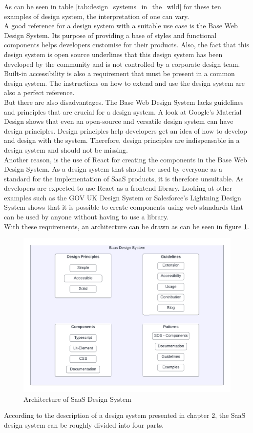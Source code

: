As can be seen in table \ref{tab:design_systems_in_the_wild} for these ten examples of design system, the interpretation of one can vary. \\
A good reference for a design system with a suitable use case is the Base Web Design System. Its purpose of providing a base of styles and functional components helps developers customise for their products. Also, the fact that this design system is open source underlines that this design system has been developed by the community and is not controlled by a corporate design team. Built-in accessibility is also a requirement that must be present in a common design system. The instructions on how to extend and use the design system are also a perfect reference. \\
But there are also disadvantages. The Base Web Design System lacks guidelines and principles that are crucial for a design system. A look at Google's Material Design shows that even an open-source and versatile design system can have design principles. Design principles help developers get an idea of how to develop and design with the system. Therefore, design principles are indispensable in a design system and should not be missing. \\ \newpage
Another reason, is the use of React for creating the components in the Base Web Design System. As a design system that should be used by everyone as a standard for the implementation of SaaS products, it is therefore unsuitable. As developers are expected to use React as a frontend library. Looking at other examples such as the GOV UK Design System or Salesforce's Lightning Design System shows that it is possible to create components using web standards that can be used by anyone without having to use a library. \\
With these requirements, an architecture can be drawn as can be seen in figure \ref{architecture_sds}. \\
\begin{figure}[htbp]
\centerline{\includegraphics[width=\linewidth]{images/architecture_sds.png}}
\caption{Architecture of SaaS Design System}
\label{architecture_sds}
\end{figure}
According to the description of a design system presented in chapter 2, the SaaS design system can be roughly divided into four parts.
